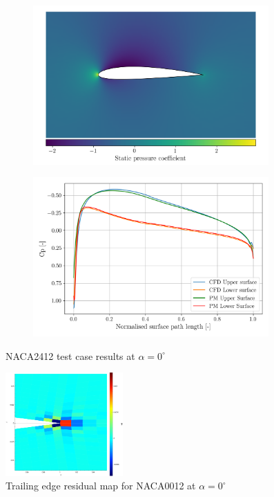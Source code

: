 \documentclass{article}
\begin{document}
\begin{figure}[H]
    \centering
    \begin{subfigure}{0.49\textwidth}
        \centering
        \includegraphics[width=0.99\textwidth]{figures/naca2412_cp.png}
        \caption{}
        \label{fig:naca2412_cp}
    \end{subfigure}
    \begin{subfigure}{0.49\textwidth}
        \centering
        \includegraphics[width=0.99\textwidth]{figures/naca2412_surface_cp_0.0.png}
        \caption{}
        \label{fig:naca2412_surface_cp}
    \end{subfigure}
    \caption{NACA2412 test case results at $\alpha = 0^\circ$}
\end{figure}

\begin{figure}[H]
    \centering
    \includegraphics[width=0.4\textwidth]{figures/kutta.png}
    \caption{Trailing edge residual map for NACA0012 at $\alpha = 0^\circ$}
    \label{fig:kutta}
\end{figure}
\end{document}
